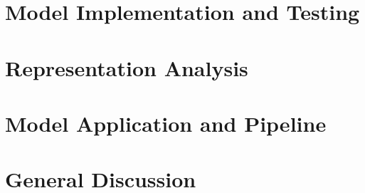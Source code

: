 \documentclass{yorkThesis}
\begin{document}
\chapter{Model Implementation and Testing}
\label{chapter_implementation_testing}


\chapter{Representation Analysis}
\label{chapter_repr_anal}


\chapter{Model Application and Pipeline}
\label{chapter_appliction}


\chapter{General Discussion}
\label{chapter_general_discussion}





\appendix



\end{document}
